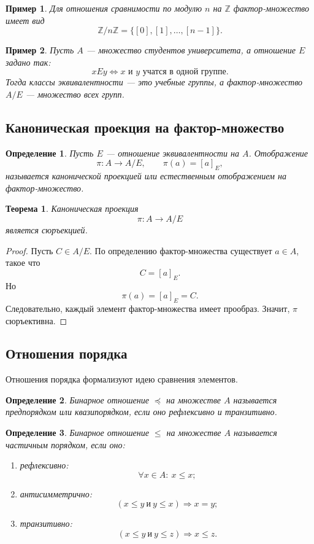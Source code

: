 \documentclass[12pt,a4paper]{article}
\newtheorem{definition}{Определение}
\newtheorem{theorem}{Теорема}
\newtheorem{example}{Пример}
\begin{document}
\begin{example}
Для отношения сравнимости по модулю $n$ на $\mathbb Z$ фактор-множество имеет вид
\[
\mathbb Z/n\mathbb Z=\{[0],[1],\dots,[n-1]\}.
\]
\end{example}

\begin{example}
Пусть $A$ --- множество студентов университета, а отношение $E$ задано так:
\[
xEy
\iff
x \text{ и } y \text{ учатся в одной группе}.
\]
Тогда классы эквивалентности --- это учебные группы, а фактор-множество $A/E$ --- множество всех групп.
\end{example}

\subsection{Каноническая проекция на фактор-множество}

\begin{definition}
Пусть $E$ --- отношение эквивалентности на $A$.
Отображение
\[
\pi:A\to A/E,
\qquad
\pi(a)=[a]_E,
\]
называется \emph{канонической проекцией} или \emph{естественным отображением} на фактор-множество.
\end{definition}

\begin{theorem}
Каноническая проекция
\[
\pi:A\to A/E
\]
является сюръекцией.
\end{theorem}

\begin{proof}
Пусть $C\in A/E$.
По определению фактор-множества существует $a\in A$, такое что
\[
C=[a]_E.
\]
Но
\[
\pi(a)=[a]_E=C.
\]
Следовательно, каждый элемент фактор-множества имеет прообраз.
Значит, $\pi$ сюръективна.
\end{proof}

\subsection{Отношения порядка}

Отношения порядка формализуют идею сравнения элементов.

\begin{definition}
Бинарное отношение $\preceq$ на множестве $A$ называется \emph{предпорядком} или \emph{квазипорядком}, если оно рефлексивно и транзитивно.
\end{definition}

\begin{definition}
Бинарное отношение $\leq$ на множестве $A$ называется \emph{частичным порядком}, если оно:

\begin{enumerate}
\item рефлексивно:
\[
\forall x\in A:\ x\leq x;
\]
\item антисимметрично:
\[
(x\leq y\ \text{и}\ y\leq x)\Rightarrow x=y;
\]
\item транзитивно:
\[
(x\leq y\ \text{и}\ y\leq z)\Rightarrow x\leq z.
\]
\end{enumerate}
\end{definition}
\end{document}
